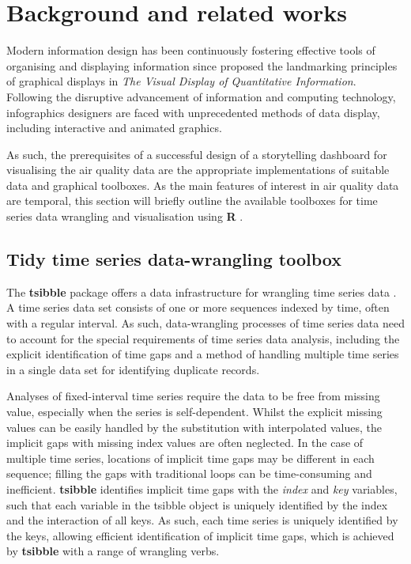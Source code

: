 \documentclass{aucklandthesis}
\begin{document}
\hypertarget{ch:litreview}{%
\chapter{Background and related works}\label{ch:litreview}}

Modern information design has been continuously fostering effective tools of organising and displaying information since \textcite{tufte} proposed the landmarking principles of graphical displays in \emph{The Visual Display of Quantitative Information}. Following the disruptive advancement of information and computing technology, infographics designers are faced with unprecedented methods of data display, including interactive and animated graphics.

As such, the prerequisites of a successful design of a storytelling dashboard for visualising the air quality data are the appropriate implementations of suitable data and graphical toolboxes. As the main features of interest in air quality data are temporal, this section will briefly outline the available toolboxes for time series data wrangling and visualisation using \textbf{R} \autocite{R2021}.

\hypertarget{tidy-time-series-data-wrangling-toolbox}{%
\section{Tidy time series data-wrangling toolbox}\label{tidy-time-series-data-wrangling-toolbox}}

The \textbf{tsibble} package offers a data infrastructure for wrangling time series data \autocite{tsibble}. A time series data set consists of one or more sequences indexed by time, often with a regular interval. As such, data-wrangling processes of time series data need to account for the special requirements of time series data analysis, including the explicit identification of time gaps and a method of handling multiple time series in a single data set for identifying duplicate records.

Analyses of fixed-interval time series require the data to be free from missing value, especially when the series is self-dependent. Whilst the explicit missing values can be easily handled by the substitution with interpolated values, the implicit gaps with missing index values are often neglected. In the case of multiple time series, locations of implicit time gaps may be different in each sequence; filling the gaps with traditional loops can be time-consuming and inefficient. \textbf{tsibble} identifies implicit time gaps with the \emph{index} and \emph{key} variables, such that each variable in the tsibble object is uniquely identified by the index and the interaction of all keys. As such, each time series is uniquely identified by the keys, allowing efficient identification of implicit time gaps, which is achieved by \textbf{tsibble} with a range of wrangling verbs.
\end{document}

